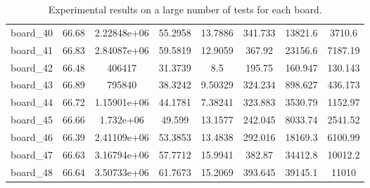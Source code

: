 \begin{table*}[!htbp]
\begin{center}
{\begin{tabular}{|c|c|cccc|cc|}
board\_40 & 66.68 & 2.22848e+06 & 55.2958 & 13.7886 & 341.733 & 13821.6 & 3710.6 \\
board\_41 & 66.83 & 2.84087e+06 & 59.5819 & 12.9059 & 367.92 & 23156.6 & 7187.19 \\
board\_42 & 66.48 & 406417 & 31.3739 & 8.5 & 195.75 & 160.947 & 130.143 \\
board\_43 & 66.89 & 795840 & 38.3242 & 9.50329 & 324.234 & 898.627 & 436.173 \\
board\_44 & 66.72 & 1.15901e+06 & 44.1781 & 7.38241 & 323.883 & 3530.79 & 1152.97 \\
board\_45 & 66.66 & 1.732e+06 & 49.599 & 13.1577 & 242.045 & 8033.74 & 2541.52 \\
board\_46 & 66.39 & 2.41109e+06 & 53.3853 & 13.4838 & 292.016 & 18169.3 & 6100.99 \\
board\_47 & 66.63 & 3.16794e+06 & 57.7712 & 15.9941 & 382.87 & 34412.8 & 10012.2 \\
board\_48 & 66.64 & 3.50733e+06 & 61.7673 & 15.2069 & 393.645 & 39145.1 & 11010 \\
\hline
\end{tabular}
}
\caption{
  \label{tab:exp_board_large_tests}
  Experimental results on a large number of tests for each board.
}
\end{center}
\end{table*}


